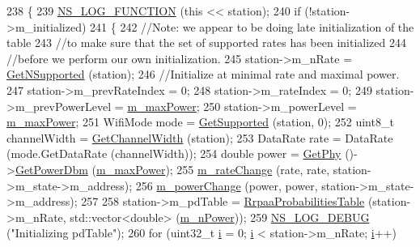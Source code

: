 \begin{DoxyCode}
238 \{
239   \hyperlink{log-macros-disabled_8h_a90b90d5bad1f39cb1b64923ea94c0761}{NS\_LOG\_FUNCTION} (\textcolor{keyword}{this} << station);
240   \textcolor{keywordflow}{if} (!station->m\_initialized)
241     \{
242       \textcolor{comment}{//Note: we appear to be doing late initialization of the table}
243       \textcolor{comment}{//to make sure that the set of supported rates has been initialized}
244       \textcolor{comment}{//before we perform our own initialization.}
245       station->m\_nRate = \hyperlink{classns3_1_1WifiRemoteStationManager_a7316bf091ebad5b8cd1a8b5ee47554d8}{GetNSupported} (station);
246       \textcolor{comment}{//Initialize at minimal rate and maximal power.}
247       station->m\_prevRateIndex = 0;
248       station->m\_rateIndex = 0;
249       station->m\_prevPowerLevel = \hyperlink{classns3_1_1RrpaaWifiManager_a8f5659ec5d99c385dcde039364b0ec8a}{m\_maxPower};
250       station->m\_powerLevel = \hyperlink{classns3_1_1RrpaaWifiManager_a8f5659ec5d99c385dcde039364b0ec8a}{m\_maxPower};
251       WifiMode mode = \hyperlink{classns3_1_1WifiRemoteStationManager_a995c8bae0d84b168fd3e8bc9ecaacdd4}{GetSupported} (station, 0);
252       uint8\_t channelWidth = \hyperlink{classns3_1_1WifiRemoteStationManager_a918213c5b9fa629c4986f6d90521bbd4}{GetChannelWidth} (station);
253       DataRate rate = DataRate (mode.GetDataRate (channelWidth));
254       \textcolor{keywordtype}{double} power = \hyperlink{classns3_1_1WifiRemoteStationManager_ab92b49cf78e0b72a51f5d13a1f15e242}{GetPhy} ()->\hyperlink{classns3_1_1WifiPhy_a91fbc9ea51bb2ac6114cad1f70e25af0}{GetPowerDbm} (\hyperlink{classns3_1_1RrpaaWifiManager_a8f5659ec5d99c385dcde039364b0ec8a}{m\_maxPower});
255       \hyperlink{classns3_1_1RrpaaWifiManager_a8036ec80b5e8683768e0081ed8f52100}{m\_rateChange} (rate, rate, station->m\_state->m\_address);
256       \hyperlink{classns3_1_1RrpaaWifiManager_a4f6bc3b3289bae4f456cff3062a6ebc0}{m\_powerChange} (power, power, station->m\_state->m\_address);
257 
258       station->m\_pdTable = \hyperlink{namespacens3_a120051d4d36bbbc9b101cb0012cb1e48}{RrpaaProbabilitiesTable} (station->m\_nRate, 
      std::vector<double> (\hyperlink{classns3_1_1RrpaaWifiManager_a109cb03ae105835a26ff09f82c5db6a2}{m\_nPower}));
259       \hyperlink{group__logging_ga413f1886406d49f59a6a0a89b77b4d0a}{NS\_LOG\_DEBUG} (\textcolor{stringliteral}{"Initializing pdTable"});
260       \textcolor{keywordflow}{for} (uint32\_t \hyperlink{bernuolliDistribution_8m_a6f6ccfcf58b31cb6412107d9d5281426}{i} = 0; \hyperlink{bernuolliDistribution_8m_a6f6ccfcf58b31cb6412107d9d5281426}{i} < station->m\_nRate; \hyperlink{bernuolliDistribution_8m_a6f6ccfcf58b31cb6412107d9d5281426}{i}++)

\end{DoxyCode}
